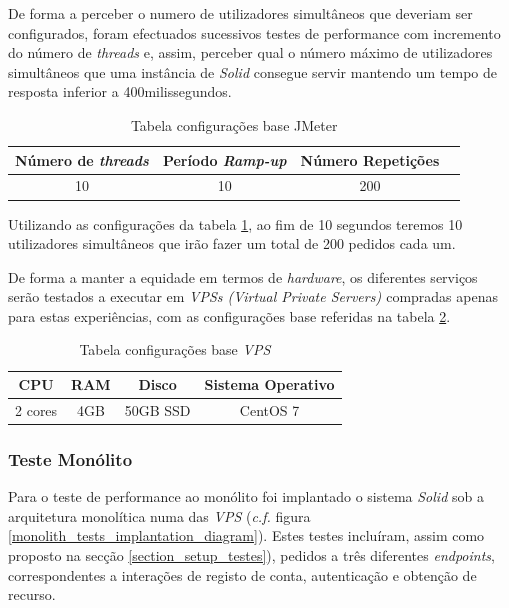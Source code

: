 De forma a perceber o numero de utilizadores simultâneos que deveriam ser configurados, foram efectuados sucessivos testes de performance com incremento do número de \emph{threads} e, assim, perceber qual o número máximo de utilizadores simultâneos que uma instância de \emph{Solid} consegue servir mantendo um tempo de resposta inferior a 400milissegundos.

\begin{table}[h]
\centering
\caption{Tabela configurações base JMeter}
\vspace{0.5cm}
\label{jmeter_configs}
\begin{tabular}{c|c|c|c} 
 Número de \emph{threads} & Período \emph{Ramp-up} & Número Repetições \\
\hline                          
10 & 10 & 200 \\
\end{tabular}
\end{table}

Utilizando as configurações da tabela \ref{jmeter_configs}, ao fim de 10 segundos teremos 10 utilizadores simultâneos que irão fazer um total de 200 pedidos cada um.

De forma a manter a equidade em termos de \emph{hardware}, os diferentes serviços serão testados a executar em \emph{VPSs (Virtual Private Servers) \label{sym:vps}} compradas apenas para estas experiências, com as configurações base referidas na tabela \ref{vps_configs}.

\begin{table}[h]
\centering
\caption{Tabela configurações base \emph{VPS}}
\vspace{0.5cm}
\label{vps_configs}
\begin{tabular}{c|c|c|c|} 
CPU & RAM & Disco & Sistema Operativo \\
\hline                          
2 cores & 4GB & 50GB SSD & CentOS 7 \\
\end{tabular}
\end{table}
\subsubsection{Teste Monólito \label{section_tests_monolith}}

Para o teste de performance ao monólito foi implantado o sistema \emph{Solid} sob a arquitetura monolítica numa das \emph{VPS} (\emph{c.f.} figura \ref{monolith_tests_implantation_diagram}). Estes testes incluíram, assim como proposto na secção \ref{section_setup_testes}), pedidos a três diferentes \emph{endpoints}, correspondentes a interações de registo de conta, autenticação e obtenção de recurso.

